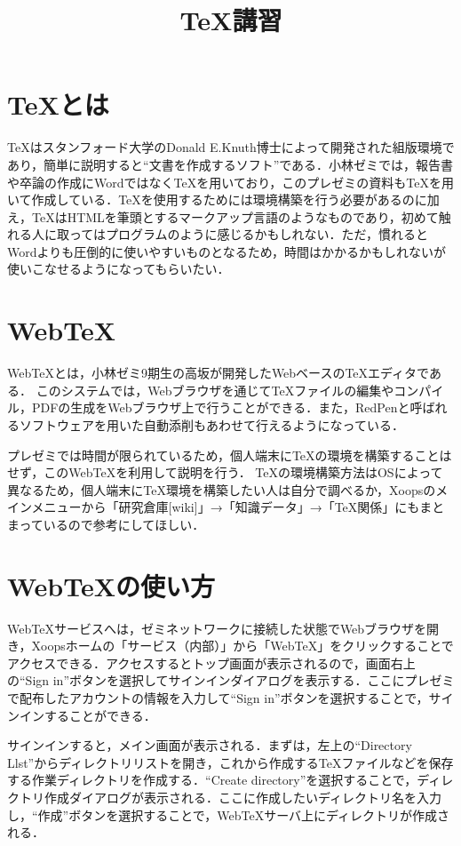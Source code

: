 \documentclass[11pt]{jarticle}
\title{\TeX 講習}
\begin{document}
\maketitle
%
% 


\section{\TeX とは}

\TeX はスタンフォード大学のDonald E.Knuth博士によって開発された組版環境であり，簡単に説明すると``文書を作成するソフト''である．小林ゼミでは，報告書や卒論の作成にWordではなく\TeX を用いており，このプレゼミの資料も\TeX を用いて作成している．\TeX を使用するためには環境構築を行う必要があるのに加え，\TeX はHTMLを筆頭とするマークアップ言語のようなものであり，初めて触れる人に取ってはプログラムのように感じるかもしれない．ただ，慣れるとWordよりも圧倒的に使いやすいものとなるため，時間はかかるかもしれないが使いこなせるようになってもらいたい．


\section{WebTeX}

WebTeXとは，小林ゼミ9期生の高坂が開発したWebベースの\TeX エディタである．
このシステムでは，Webブラウザを通じて\TeX ファイルの編集やコンパイル，PDFの生成をWebブラウザ上で行うことができる．また，RedPenと呼ばれるソフトウェアを用いた自動添削もあわせて行えるようになっている．

プレゼミでは時間が限られているため，個人端末にTeXの環境を構築することはせず，このWebTeXを利用して説明を行う．
\TeX の環境構築方法はOSによって異なるため，個人端末に\TeX 環境を構築したい人は自分で調べるか，Xoopsのメインメニューから「研究倉庫[wiki]」→「知識データ」→「TeX関係」にもまとまっているので参考にしてほしい．


\section{WebTeXの使い方}

WebTeXサービスへは，ゼミネットワークに接続した状態でWebブラウザを開き，Xoopsホームの「サービス（内部）」から「WebTeX」をクリックすることでアクセスできる．アクセスするとトップ画面が表示されるので，画面右上の``Sign in''ボタンを選択してサインインダイアログを表示する．ここにプレゼミで配布したアカウントの情報を入力して``Sign in''ボタンを選択することで，サインインすることができる．

サインインすると，メイン画面が表示される．まずは，左上の``Directory Llst''からディレクトリリストを開き，これから作成する\TeX ファイルなどを保存する作業ディレクトリを作成する．``Create directory''を選択することで，ディレクトリ作成ダイアログが表示される．ここに作成したいディレクトリ名を入力し，``作成''ボタンを選択することで，WebTeXサーバ上にディレクトリが作成される．
\end{document}

